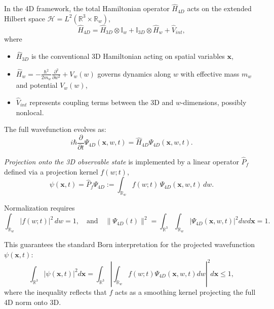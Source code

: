 \documentclass[12pt]{article}
\begin{document}
In the 4D framework, the total Hamiltonian operator $\hat{H}_{4D}$ acts on the extended Hilbert space $\mathcal{H} = L^2(\mathbb{R}^3 \times \mathbb{R}_w)$,
\begin{equation}
    \hat{H}_{4D} = \hat{H}_{3D} \otimes \mathbb{I}_w + \mathbb{I}_{3D} \otimes \hat{H}_w + \hat{V}_{int},
    \label{eq:total_Hamiltonian_4D}
\end{equation}
where
\begin{itemize}
    \item $\hat{H}_{3D}$ is the conventional 3D Hamiltonian acting on spatial variables $\mathbf{x}$,
    \item $\hat{H}_w = -\frac{\hbar^2}{2m_w} \frac{\partial^2}{\partial w^2} + V_w(w)$ governs dynamics along $w$ with effective mass $m_w$ and potential $V_w(w)$,
    \item $\hat{V}_{int}$ represents coupling terms between the 3D and $w$-dimensions, possibly nonlocal.
\end{itemize}

The full wavefunction evolves as:
\begin{equation}
    i \hbar \frac{\partial}{\partial t} \Psi_{4D}(\mathbf{x}, w, t) = \hat{H}_{4D} \Psi_{4D}(\mathbf{x}, w, t).
    \label{eq:4d_schrodinger_operator}
\end{equation}

\emph{Projection onto the 3D observable state} is implemented by a linear operator $\hat{P}_f$ defined via a projection kernel $f(w;t)$,
\begin{equation}
    \psi(\mathbf{x}, t) = \hat{P}_f \Psi_{4D} := \int_{\mathbb{R}_w} f(w; t) \, \Psi_{4D}(\mathbf{x}, w, t) \, dw.
    \label{eq:projection_operator}
\end{equation}

Normalization requires
\begin{equation}
    \int_{\mathbb{R}_w} |f(w; t)|^2 \, dw = 1,
    \quad \text{and} \quad \|\Psi_{4D}(t)\|^2 = \int_{\mathbb{R}^3} \int_{\mathbb{R}_w} |\Psi_{4D}(\mathbf{x}, w, t)|^2 dw d\mathbf{x} = 1.
    \label{eq:normalization_conditions}
\end{equation}

This guarantees the standard Born interpretation for the projected wavefunction $\psi(\mathbf{x}, t)$:
\begin{equation}
    \int_{\mathbb{R}^3} |\psi(\mathbf{x}, t)|^2 d\mathbf{x} = \int_{\mathbb{R}^3} \left| \int_{\mathbb{R}_w} f(w; t) \Psi_{4D}(\mathbf{x}, w, t) dw \right|^2 d\mathbf{x} \leq 1,
    \label{eq:born_projection}
\end{equation}
where the inequality reflects that $f$ acts as a smoothing kernel projecting the full 4D norm onto 3D.
\end{document}
